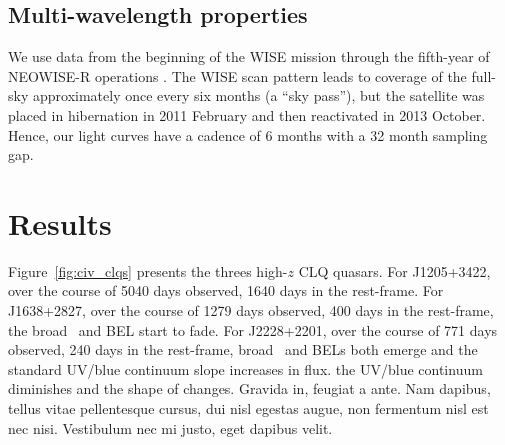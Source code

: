 \documentclass[a4paper,fleqn,usenatbib]{mnras}
\begin{document}
\subsection{Multi-wavelength properties}
We use data from the beginning of the WISE mission \citep[2010
January; ][]{Wright2010} through the fifth-year of NEOWISE-R
operations \citep[2018 December; ][]{Mainzer2011}. The WISE scan
pattern leads to coverage of the full-sky approximately once every six
months (a ``sky pass''), but the satellite was placed in hibernation
in 2011 February and then reactivated in 2013 October. Hence, our
light curves have a cadence of 6 months with a 32 month sampling gap.



\section{Results}
Figure~\ref{fig:civ_clqs} presents the threes high-$z$ CLQ quasars. 
For J1205+3422, over the course of 5040 days observed, 1640 days in the
rest-frame. 
For J1638+2827, over the course of 1279 days observed, 400 days in the
rest-frame, the broad \civ\ and \ciii BEL start to fade.  For
J2228+2201, over the course of 771 days observed, 240 days in the
rest-frame, broad \civ\ and \ciii BELs both emerge and the standard
UV/blue continuum slope increases in flux.  the UV/blue continuum
diminishes and the shape of \lya changes.
Gravida in, feugiat a ante. Nam dapibus, tellus vitae pellentesque
cursus, dui nisl egestas augue, non fermentum nisl est nec
nisi. Vestibulum nec mi justo, eget dapibus velit.
\end{document}
